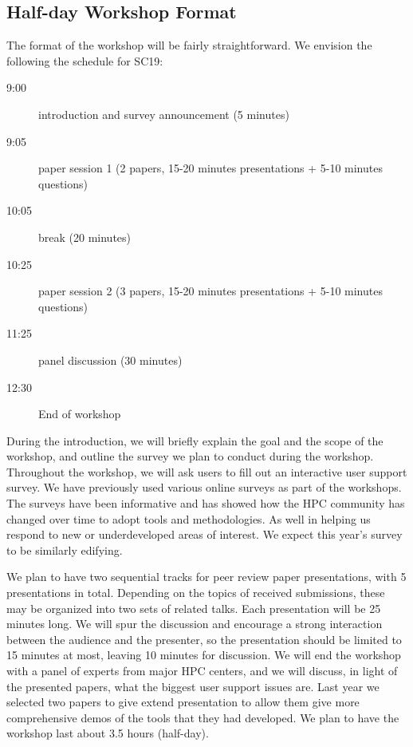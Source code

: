 \documentclass[a4paper,10pt]{article}
\begin{document}
\subsection*{Half-day Workshop Format}
\label{Half day workshop format}

The format of the workshop will be fairly straightforward. We envision the following the schedule for SC19:

\begin{description}
    \item[9:00] introduction and survey announcement (5 minutes)
    \item[9:05] paper session 1 (2 papers, 15-20 minutes presentations + 5-10 minutes questions)
    \item[10:05] break (20 minutes)
    \item[10:25] paper session 2 (3 papers, 15-20 minutes presentations + 5-10 minutes questions)
    \item[11:25] panel discussion  (30 minutes)
	\item[12:30] End of workshop
\end{description}

During the introduction, we will briefly explain the goal and the scope of the
workshop, and outline the survey we plan to conduct during the workshop.
%
Throughout the workshop, we will ask users to fill out an interactive user support
survey. We have previously used various online surveys as part of the workshops. 
The surveys have been informative and has showed how the HPC community has changed
over time to adopt tools and methodologies. As well in helping us respond to new or underdeveloped areas
of interest. We expect this year's survey to be similarly edifying.

We plan to have two sequential tracks for peer review paper presentations, with 5 presentations
in total. Depending on the topics of received submissions, these may be organized
into two sets of related talks. Each presentation will be 25 minutes long.
We will spur the discussion and encourage a strong interaction between the 
audience and the presenter, so the presentation should be limited to 15 minutes at
most, leaving 10 minutes for discussion.
%
We will end the workshop with a panel of experts from major HPC centers, and we will
discuss, in light of the presented papers, what the biggest user support issues are. Last 
year we selected two papers to give extend presentation to allow them give more 
comprehensive demos of the tools that they had developed.  
We plan to have the workshop last about 3.5 hours (half-day).
\end{document}
